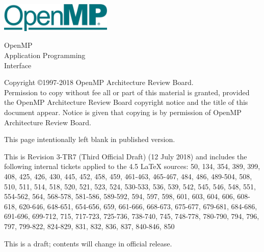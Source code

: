 
  \begin{titlepage}
    \begin{flushleft}
     \hspace{-6em} \includegraphics[width=0.4\textwidth]{openmp-logo.png}
    \end{flushleft}

    \begin{adjustwidth}{-0.75in}{0in}
    \begin{center}
      \Huge
      \textsf{OpenMP\\Application Programming\\Interface}

      \vspace{0.5in}\textsf{    }\vspace{-0.7in}
      \normalsize

      \vspace{1.0in}

      \textbf{\ompversion{}}
    \end{center}
    \end{adjustwidth}

    \vspace{3.0in}

\begin{adjustwidth}{0pt}{1em}\setlength{\parskip}{0.25\baselineskip}%
Copyright \copyright 1997-2018 OpenMP Architecture Review Board.\\
Permission to copy without fee all or part of this material is granted,
provided the OpenMP Architecture Review Board copyright notice and
the title of this document appear. Notice is given that copying is by
permission of OpenMP Architecture Review Board.\end{adjustwidth}

  \end{titlepage}


\clearpage
\thispagestyle{empty}
\phantom{a}
This page intentionally left blank in published version.

This is Revision 3-TR7 (Third Official Draft) (12 July 2018) and
includes the following internal tickets applied to the 4.5 LaTeX sources:
50, 134, 354, 389, 399, 408, 425, 426, 430, 445, 452, 458, 459, 461-463, 
465-467, 484, 486, 489-504, 508, 510, 511, 514, 518, 520, 521, 523, 
524, 530-533, 536, 539, 542, 545, 546, 548, 551, 554-562, 564, 568-578, 
581-586, 589-592, 594, 597, 598, 601, 603, 604, 606, 608-618, 620-646, 
648-651, 654-656, 659, 661-666, 668-673, 675-677, 679-681, 684-686, 
691-696, 699-712, 715, 717-723, 725-736, 738-740, 745, 748-778, 780-790, 
794, 796, 797, 799-822, 824-829, 831, 832, 836, 837, 840-846, 850

This is a draft; contents will change in official release.

\vfill

